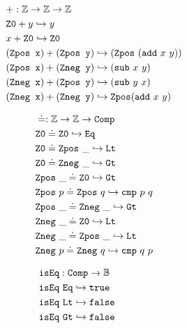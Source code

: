 \begin{figure}
\centering
\begin{minipage}[t]{0.48\textwidth}
\begin{align*}
&+: \mathbb{Z} \rightarrow \mathbb{Z} \rightarrow \mathbb{Z} \\
& \texttt{Z0} + y \hookrightarrow y \\
& x + \texttt{Z0} \hookrightarrow \texttt{Z0} \\
& (\texttt{Zpos x}) + (\texttt{Zpos y}) \hookrightarrow (\texttt{Zpos}~(\texttt{add}~x~y))  \\
& (\texttt{Zpos x}) + (\texttt{Zneg y}) \hookrightarrow (\texttt{sub}~x~y)  \\
& (\texttt{Zneg x}) + (\texttt{Zpos y}) \hookrightarrow (\texttt{sub}~y~x)  \\
& (\texttt{Zneg x}) + (\texttt{Zneg y}) \hookrightarrow \texttt{Zpos}(\texttt{add}~x~y)  \\
\end{align*}
\hfill
\end{minipage}
\begin{minipage}[t]{0.48\textwidth}
\begin{align*}
&\doteq : \mathbb{Z} \rightarrow \mathbb{Z} \rightarrow \texttt{Comp} \\
& \texttt{Z0} \doteq \texttt{Z0} \hookrightarrow \texttt{Eq} \\
& \texttt{Z0} \doteq \texttt{Zpos}~\_ \hookrightarrow \texttt{Lt} \\
& \texttt{Z0} \doteq \texttt{Zneg}~\_ \hookrightarrow \texttt{Gt} \\
& \texttt{Zpos}~\_ \doteq \texttt{Z0} \hookrightarrow \texttt{Gt} \\
& \texttt{Zpos}~p \doteq \texttt{Zpos}~q \hookrightarrow \texttt{cmp}~p~q \\
& \texttt{Zpos}~\_ \doteq \texttt{Zneg}~\_ \hookrightarrow \texttt{Gt} \\
& \texttt{Zneg}~\_ \doteq \texttt{Z0} \hookrightarrow \texttt{Lt} \\
& \texttt{Zneg}~\_ \doteq \texttt{Zpos}~\_ \hookrightarrow \texttt{Lt} \\
& \texttt{Zneg}~p \doteq \texttt{Zneg}~q \hookrightarrow \texttt{cmp}~q~p \\
\end{align*}
\end{minipage}
\noindent
\[
\begin{array}{l@{\hspace{4em}}l@{\hspace{4em}}l}
\begin{aligned}
  &\tt{isEq} : \tt{Comp} \ra \bb{B} \\
  &\tt{isEq}~\tt{Eq} \re \tt{true} \\
  &\tt{isEq}~\tt{Lt} \re \tt{false} \\
  &\tt{isEq}~\tt{Gt} \re \tt{false} \\
\end{aligned}

\end{array}\]
\end{figure}
